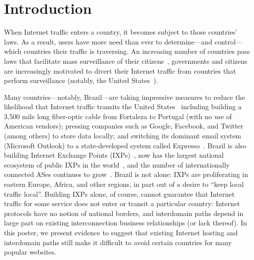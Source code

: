 \section{Introduction}
\label{intro}

When Internet traffic enters a country, it becomes subject to those
countries' laws.  As a result, users have more need than ever to
determine---and control---which countries their traffic is traversing.
An increasing number of countries pass laws that facilitate mass
surveillance of their citizens~\cite{france_surveillance,
  netherlands_surveillance, kazak_surveillance, uk_bill}, governments
and citizens are increasingly motivated to divert their Internet traffic
from countries that perform surveillance (notably, the United
States~\cite{russia_secure_internet,
  routing_errors, dte}).

Many countries---notably, Brazil---are taking impressive measures to reduce
the likelihood that Internet traffic transits the United
States~\cite{brazil_history, brazil_break_from_US, brazil_conference,
  brazil_conference2, brazil_human_rights} including building a 3,500
mile long fiber-optic cable from Fortaleza to Portugal (with no use of
American vendors); pressing companies such as Google, Facebook, and
Twitter (among others) to store data locally; and switching its dominant
email system (Microsoft Outlook) to a state-developed system called
Expresso~\cite{brazil_cable, brazil_us_companies}.  Brazil is also
building Internet Exchange Points (IXPs)~\cite{brazil_IXP1}, now has the
largest national ecosystem of public IXPs in
the world~\cite{brazil_ixp_ecosystem}, and the number of internationally
connected ASes continues to
grow~\cite{brazil_international_ases}. Brazil is not alone: IXPs are
proliferating in eastern Europe, Africa, and other regions, in part out
of a desire to ``keep local traffic local''. Building IXPs alone, of
course, cannot guarantee that Internet traffic for some service does not
enter or transit a particular country: Internet protocols have no notion
of national borders, and interdomain paths depend in large part on
existing interconnection business relationships (or lack thereof).  In
this poster, we present evidence to suggest that existing Internet
hosting and interdomain paths still make it difficult to avoid certain
countries for many popular websites. 

